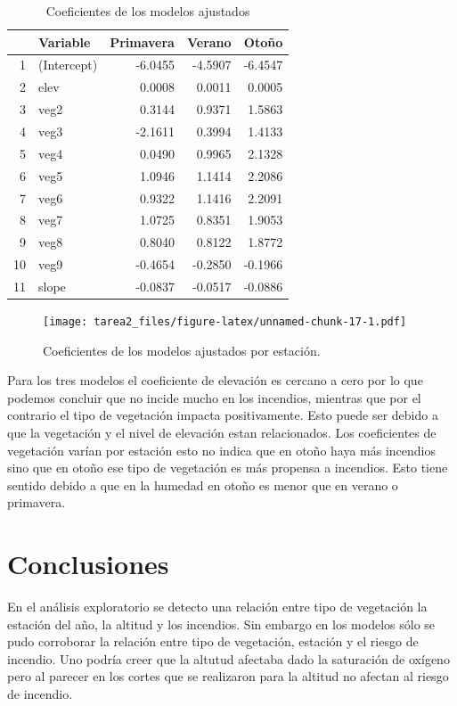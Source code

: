 \documentclass[12,]{article}
\begin{document}
\begin{table}[ht]
\centering
\begin{tabular}{rlrrr}
  \hline
 & Variable & Primavera & Verano & Otoño \\
  \hline
1 & (Intercept) & -6.0455 & -4.5907 & -6.4547 \\
  2 & elev & 0.0008 & 0.0011 & 0.0005 \\
  3 & veg2 & 0.3144 & 0.9371 & 1.5863 \\
  4 & veg3 & -2.1611 & 0.3994 & 1.4133 \\
  5 & veg4 & 0.0490 & 0.9965 & 2.1328 \\
  6 & veg5 & 1.0946 & 1.1414 & 2.2086 \\
  7 & veg6 & 0.9322 & 1.1416 & 2.2091 \\
  8 & veg7 & 1.0725 & 0.8351 & 1.9053 \\
  9 & veg8 & 0.8040 & 0.8122 & 1.8772 \\
  10 & veg9 & -0.4654 & -0.2850 & -0.1966 \\
  11 & slope & -0.0837 & -0.0517 & -0.0886 \\
   \hline
\end{tabular}
\caption{Coeficientes de los modelos ajustados}
\end{table}

\begin{figure}[H]
\centering
\texttt{[image: tarea2\_files/figure-latex/unnamed-chunk-17-1.pdf]}
\caption{Coeficientes de los modelos ajustados por estación.}
\end{figure}

Para los tres modelos el coeficiente de elevación es cercano a cero por
lo que podemos concluir que no incide mucho en los incendios, mientras
que por el contrario el tipo de vegetación impacta positivamente. Esto
puede ser debido a que la vegetación y el nivel de elevación estan
relacionados. Los coeficientes de vegetación varían por estación esto no
indica que en otoño haya más incendios sino que en otoño ese tipo de
vegetación es más propensa a incendios. Esto tiene sentido debido a que
en la humedad en otoño es menor que en verano o primavera.

\section{Conclusiones}\label{conclusiones}

En el análisis exploratorio se detecto una relación entre tipo de
vegetación la estación del año, la altitud y los incendios. Sin embargo
en los modelos sólo se pudo corroborar la relación entre tipo de
vegetación, estación y el riesgo de incendio. Uno podría creer que la
altutud afectaba dado la saturación de oxígeno pero al parecer en los
cortes que se realizaron para la altitud no afectan al riesgo de
incendio.
\end{document}
